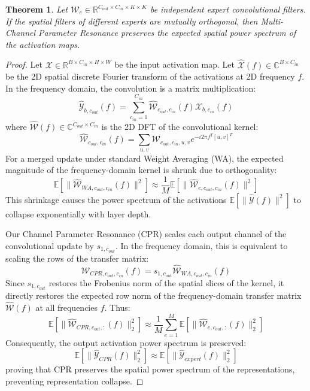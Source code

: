 \documentclass{article}
\theoremstyle{plain}
\newtheorem{theorem}{Theorem}[section]
\theoremstyle{definition}
\theoremstyle{remark}
\begin{document}
\begin{theorem}
Let $\mathcal{W}_e \in \mathbb{R}^{C_{out} \times C_{in} \times K \times K}$ be independent expert convolutional filters. If the spatial filters of different experts are mutually orthogonal, then Multi-Channel Parameter Resonance preserves the expected spatial power spectrum of the activation maps.
\end{theorem}

\begin{proof}
Let $\mathcal{X} \in \mathbb{R}^{B \times C_{in} \times H \times W}$ be the input activation map. Let $\hat{\mathcal{X}}(f) \in \mathbb{C}^{B \times C_{in}}$ be the 2D spatial discrete Fourier transform of the activations at 2D frequency $f$. In the frequency domain, the convolution is a matrix multiplication:
\begin{equation}
    \hat{\mathcal{Y}}_{b, c_{out}}(f) = \sum_{c_{in}=1}^{C_{in}} \hat{\mathcal{W}}_{c_{out}, c_{in}}(f) \hat{\mathcal{X}}_{b, c_{in}}(f)
\end{equation}
where $\hat{\mathcal{W}}(f) \in \mathbb{C}^{C_{out} \times C_{in}}$ is the 2D DFT of the convolutional kernel:
\begin{equation}
    \hat{\mathcal{W}}_{c_{out}, c_{in}}(f) = \sum_{u, v} \mathcal{W}_{c_{out}, c_{in}, u, v} e^{-i 2\pi f^T [u, v]^T}
\end{equation}
For a merged update under standard Weight Averaging (WA), the expected magnitude of the frequency-domain kernel is shrunk due to orthogonality:
\begin{equation}
    \mathbb{E}[\|\hat{\mathcal{W}}_{WA, c_{out}, c_{in}}(f)\|^2] \approx \frac{1}{M} \mathbb{E}[\|\hat{\mathcal{W}}_{e, c_{out}, c_{in}}(f)\|^2]
\end{equation}
This shrinkage causes the power spectrum of the activations $\mathbb{E}[\|\hat{\mathcal{Y}}(f)\|^2]$ to collapse exponentially with layer depth.

Our Channel Parameter Resonance (CPR) scales each output channel of the convolutional update by $s_{1, c_{out}}$. In the frequency domain, this is equivalent to scaling the rows of the transfer matrix:
\begin{equation}
    \hat{\mathcal{W}}_{CPR, c_{out}, c_{in}}(f) = s_{1, c_{out}} \hat{\mathcal{W}}_{WA, c_{out}, c_{in}}(f)
\end{equation}
Since $s_{1, c_{out}}$ restores the Frobenius norm of the spatial slices of the kernel, it directly restores the expected row norm of the frequency-domain transfer matrix $\hat{\mathcal{W}}(f)$ at all frequencies $f$. Thus:
\begin{equation}
    \mathbb{E}[\|\hat{\mathcal{W}}_{CPR, c_{out}, :}(f)\|^2_2] \approx \frac{1}{M}\sum_{e=1}^M \mathbb{E}[\|\hat{\mathcal{W}}_{e, c_{out}, :}(f)\|^2_2]
\end{equation}
Consequently, the output activation power spectrum is preserved:
\begin{equation}
    \mathbb{E}[\|\hat{\mathcal{Y}}_{CPR}(f)\|_2^2] \approx \mathbb{E}[\|\hat{\mathcal{Y}}_{expert}(f)\|_2^2]
\end{equation}
proving that CPR preserves the spatial power spectrum of the representations, preventing representation collapse.
\end{proof}
\end{document}
